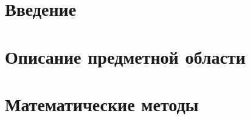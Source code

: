 \documentclass{fefu}
\author{Сластен Т.Д.}
\begin{document}

  \tableofcontents
  \pagebreak


  \section*{Введение}
  
  \section{Описание предметной области}
  
  \section{Математические методы}
  

\end{document}
